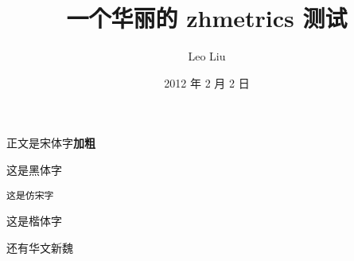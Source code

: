 \documentclass[12pt,a4paper]{article}
\title{一个华丽的 zhmetrics 测试}
\author{Leo Liu}
\date{2012 年 2 月 2 日}
\begin{document}
\maketitle

正文是宋体字\textbf{加粗}

\textsf{这是黑体字}

\texttt{这是仿宋字}

{这是楷体字}

{还有华文新魏}
\end{document}
